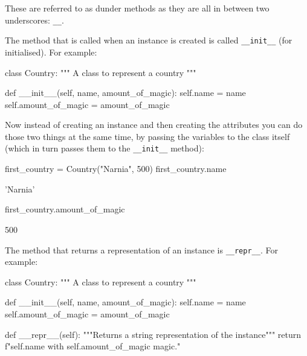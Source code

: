 These are referred to as dunder methods as they are all in between two
underscores: \texttt{\_\_}.


The method that is called when an instance is created is called \texttt{\_\_init\_\_} (for
initialised). For example:


\begin{pyin}
class Country:
    """
    A class to represent a country
    """

    def __init__(self, name, amount_of_magic):
        self.name = name
        self.amount_of_magic = amount_of_magic
\end{pyin}





Now instead of creating an instance and then creating the attributes you can do
those two things at the same time, by passing the variables to the class itself
(which in turn passes them to the \texttt{\_\_init\_\_} method):




\begin{pyin}
first_country = Country("Narnia", 500)
first_country.name
\end{pyin}





\begin{raw}
'Narnia'
\end{raw}


\begin{pyin}
first_country.amount_of_magic
\end{pyin}





\begin{raw}
500
\end{raw}





The method that returns a representation of an instance is \texttt{\_\_repr\_\_}. For
example:




\begin{pyin}
class Country:
    """
    A class to represent a country
    """

    def __init__(self, name, amount_of_magic):
        self.name = name
        self.amount_of_magic = amount_of_magic

    def __repr__(self):
        """Returns a string representation of the instance"""
        return f"{self.name} with {self.amount_of_magic} magic."
\end{pyin}







